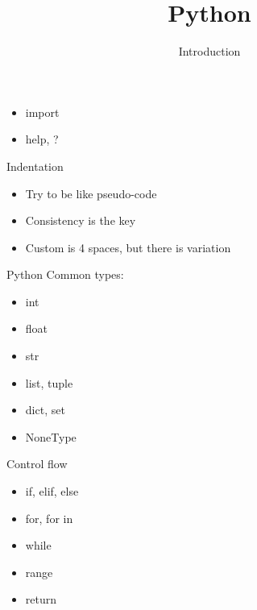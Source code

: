 
\title{Python}
\subtitle{Introduction}




\begin{frame}
  \titlepage
\end{frame}

\begin{frame}
\end{frame}

\begin{frame}
\end{frame}

\begin{frame}
\end{frame}

\begin{frame}
  \begin{itemize}
  \item import
  \item help, ?
  \end{itemize}
\end{frame}

\begin{frame}{Indentation}
  \begin{itemize}
  \item Try to be like pseudo-code
  \item Consistency is the key
  \item Custom is 4 spaces, but there is variation
  \end{itemize}
\end{frame}

\begin{frame}{Python}
  Common types:
  \begin{itemize}
  \item int
  \item float
  \item str
  \item list, tuple
  \item dict, set
  \item NoneType
  \end{itemize}
\end{frame}

\begin{frame}{Control flow}
  \begin{itemize}
  \item if, elif, else
  \item for, for in
  \item while
  \item range
  \item return
  \end{itemize}
\end{frame}


